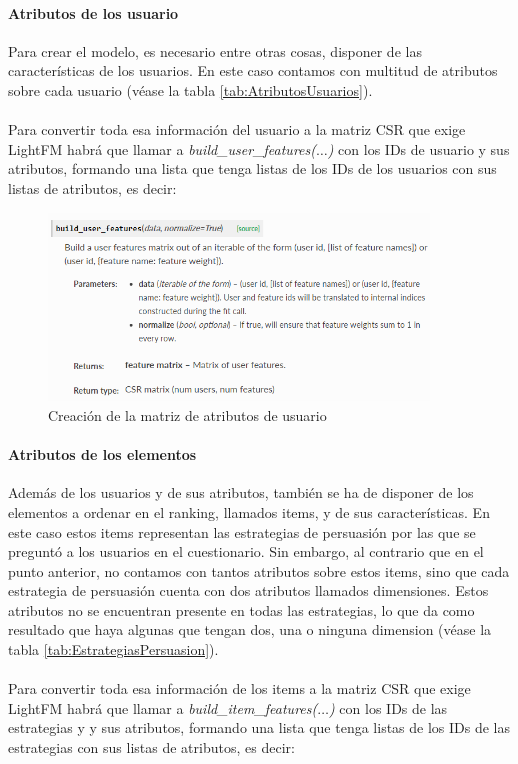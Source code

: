 \paragraph{Atributos de los usuario}
Para crear el modelo, es necesario entre otras cosas, disponer de las características de los usuarios. En este caso contamos con multitud de atributos sobre cada usuario (véase la tabla \ref{tab:AtributosUsuarios}).
\\ \\
Para convertir toda esa información del usuario a la matriz CSR que exige LightFM habrá que llamar a \textit{build\_user\_features($\ldots$)} con los IDs de usuario y sus atributos, formando una lista que tenga listas de los IDs de los usuarios con sus listas de atributos, es decir:

\begin{figure}[H]
    \centering
    \includegraphics[width=0.9\textwidth]{Figuras/LightFM_build_user_features.png}    
    \caption{Creación de la matriz de atributos de usuario} 
    \label{fig:BuildUserFeatures}
\end{figure}

\paragraph{Atributos de los elementos}
Además de los usuarios y de sus atributos, también se ha de disponer de los elementos a ordenar en el ranking, llamados items, y de sus características. En este caso estos items representan las estrategias de persuasión por las que se preguntó a los usuarios en el cuestionario. Sin embargo, al contrario que en el punto anterior, no contamos con tantos atributos sobre estos items, sino que cada estrategia de persuasión cuenta con dos atributos llamados dimensiones. Estos atributos no se encuentran presente en todas las estrategias, lo que da como resultado que haya algunas que tengan dos, una o ninguna dimension (véase la tabla \ref{tab:EstrategiasPersuasion}).
\\ \\
Para convertir toda esa información de los items a la matriz CSR que exige LightFM habrá que llamar a \textit{build\_item\_features($\ldots$)} con los IDs de las estrategias y y sus atributos, formando una lista que tenga listas de los IDs de las estrategias con sus listas de atributos, es decir:


